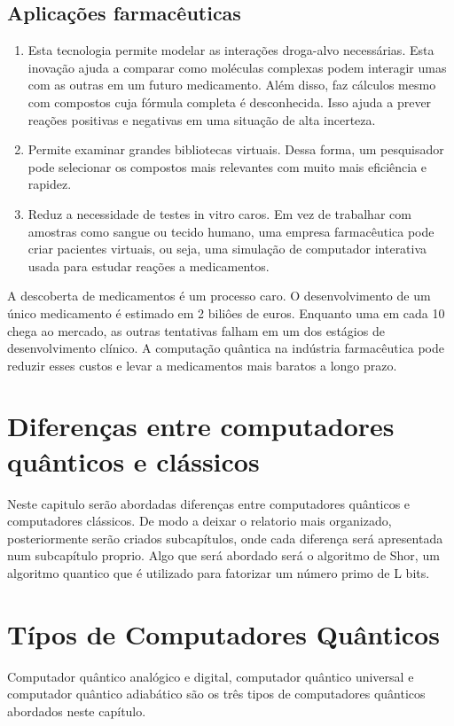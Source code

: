 \documentclass{report}
\begin{document}
\section{Aplicações farmacêuticas}
\begin{enumerate}
    \item Esta tecnologia permite modelar as interações droga-alvo necessárias. Esta inovação ajuda a comparar como moléculas complexas podem interagir umas com as outras em um futuro medicamento. Além disso, faz cálculos mesmo com compostos cuja fórmula completa é desconhecida. Isso ajuda a prever reações positivas e negativas em uma situação de alta incerteza.
    \item Permite examinar grandes bibliotecas virtuais. Dessa forma, um pesquisador pode selecionar os compostos mais relevantes com muito mais eficiência e rapidez.
    \item Reduz a necessidade de testes in vitro caros. Em vez de trabalhar com amostras como sangue ou tecido humano, uma empresa farmacêutica pode criar pacientes virtuais, ou seja, uma simulação de computador interativa usada para estudar reações a medicamentos.
\end{enumerate}
A descoberta de medicamentos é um processo caro. O desenvolvimento de um único medicamento é estimado em 2 biliôes de euros. Enquanto uma em cada 10 chega ao mercado, as outras tentativas falham em um dos estágios de desenvolvimento clínico. A computação quântica na indústria farmacêutica pode reduzir esses custos e levar a medicamentos mais baratos a longo prazo.



\chapter{Diferenças entre computadores quânticos e clássicos}
\label{chap.diferencas}
Neste capitulo serão abordadas diferenças entre computadores quânticos e computadores clássicos. De modo a deixar o relatorio mais organizado, posteriormente
serão criados subcapítulos, onde cada diferença será apresentada num subcapítulo proprio.
Algo que será abordado será o algoritmo de Shor, um algoritmo quantico que é utilizado para fatorizar um número primo de L bits.

\chapter{Típos de Computadores Quânticos}
\label{chap.tipos}
Computador quântico analógico e digital, computador quântico universal e computador quântico adiabático são os três tipos de computadores quânticos abordados neste capítulo.
\end{document}
